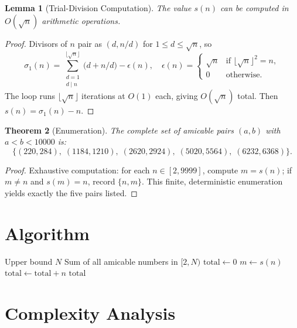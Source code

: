 \documentclass[12pt,a4paper]{article}
\newtheorem{theorem}{Theorem}
\newtheorem{lemma}[theorem]{Lemma}
\theoremstyle{definition}
\begin{document}
\begin{lemma}[Trial-Division Computation]
The value $s(n)$ can be computed in $O(\sqrt{n})$ arithmetic operations.
\end{lemma}

\begin{proof}
Divisors of $n$ pair as $(d, n/d)$ for $1 \leq d \leq \sqrt{n}$, so
\[
\sigma_1(n) = \sum_{\substack{d=1 \\ d \mid n}}^{\lfloor\sqrt{n}\rfloor} \!\bigl(d + n/d\bigr) - \epsilon(n), \quad
\epsilon(n) = \begin{cases} \sqrt{n} & \text{if } \lfloor\sqrt{n}\rfloor^2 = n, \\ 0 & \text{otherwise.}\end{cases}
\]
The loop runs $\lfloor\sqrt{n}\rfloor$ iterations at $O(1)$ each, giving $O(\sqrt{n})$ total. Then $s(n) = \sigma_1(n) - n$.
\end{proof}

\begin{theorem}[Enumeration]
The complete set of amicable pairs $(a,b)$ with $a < b < 10000$ is:
\[
\{(220, 284),\; (1184, 1210),\; (2620, 2924),\; (5020, 5564),\; (6232, 6368)\}.
\]
\end{theorem}

\begin{proof}
Exhaustive computation: for each $n \in [2, 9999]$, compute $m = s(n)$; if $m \neq n$ and $s(m) = n$, record $\{n, m\}$. This finite, deterministic enumeration yields exactly the five pairs listed.
\end{proof}

\section{Algorithm}

\begin{algorithm}[H]
\caption{Sum of Amicable Numbers below $N$}
\begin{algorithmic}[1]
\REQUIRE Upper bound $N$
\ENSURE Sum of all amicable numbers in $[2, N)$
\STATE $\mathrm{total} \gets 0$
    \STATE $m \gets s(n)$
        \STATE $\mathrm{total} \gets \mathrm{total} + n$
    \ENDIF
\ENDFOR
\RETURN $\mathrm{total}$
\end{algorithmic}
\end{algorithm}

\section{Complexity Analysis}
\end{document}
